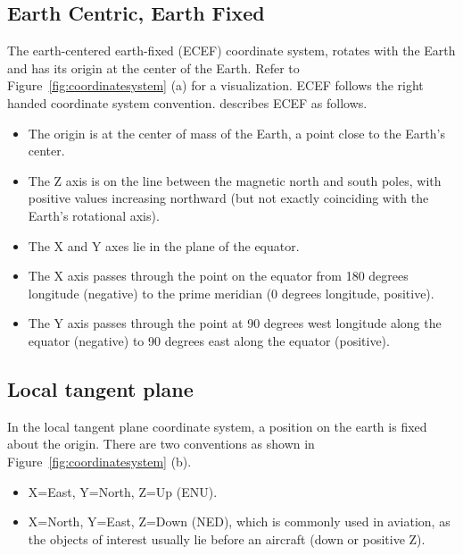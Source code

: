 \subsection{Earth Centric, Earth Fixed}

The earth-centered earth-fixed (ECEF) coordinate system, rotates with the Earth and has its origin at the center of the Earth. Refer to Figure~\ref{fig:coordinatesystem} (a) for a visualization. ECEF follows the right handed coordinate system convention.  describes ECEF as follows.

\begin{itemize}
	\item The origin is at the center of mass of the Earth, a point close to the Earth's center.
	\item The Z axis is on the line between the magnetic north and south poles, with positive values increasing northward (but not exactly coinciding with the Earth's rotational axis).
	\item The X and Y axes lie in the plane of the equator.
	\item The X axis passes through the point on the equator from 180 degrees longitude (negative) to the prime meridian (0 degrees longitude, positive).
	\item The Y axis passes through the point at 90 degrees west longitude along the equator (negative) to 90 degrees east along the equator (positive).
\end{itemize}

\subsection{Local tangent plane}

In the local tangent plane coordinate system, a position on the earth is fixed about the origin. There are two conventions as shown in Figure~\ref{fig:coordinatesystem} (b).

\begin{itemize}
	\item X=East, Y=North, Z=Up (ENU).
	\item X=North, Y=East, Z=Down (NED), which is commonly used in aviation, as the objects of interest usually lie before an aircraft (down or positive Z).
\end{itemize}

